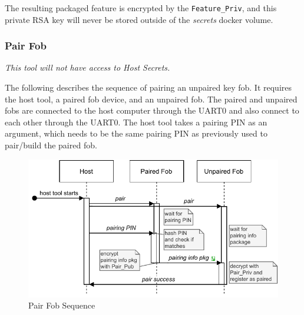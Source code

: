 \documentclass[11pt,oneside,onecolumn,letterpaper]{article}
\begin{document}
The resulting packaged feature is encrypted by the \verb|Feature_Priv|, and this private RSA key will never be stored outside of the \textit{secrets} docker volume.

\subsubsection{Pair Fob}

\textit{This tool will not have access to Host Secrets.}

The following describes the sequence of pairing an unpaired key fob. It requires the host tool, a paired fob device, and an unpaired fob. The paired and unpaired fobs are connected to the host computer through the UART0 and also connect to each other through the UART0. The host tool takes a pairing PIN as an argument, which needs to be the same pairing PIN as previously used to pair/build the paired fob.

\begin{figure}[!htbp]
	\begin{centering}
		\includegraphics[width = .6\textwidth]{pic/pair.pdf}
		\caption{Pair Fob Sequence}
		\label{fig:pair}
	\end{centering}
\end{figure}
\end{document}
